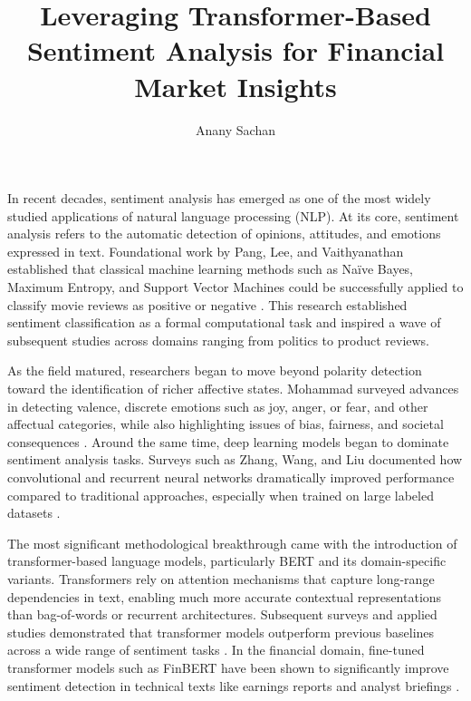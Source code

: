 \documentclass[12pt]{article}
\title{\textbf{Leveraging Transformer-Based Sentiment Analysis for Financial Market Insights}}
\author{Anany Sachan}
\begin{document}
\maketitle

In recent decades, sentiment analysis has emerged as one of the most widely studied applications of
natural language processing (NLP). At its core, sentiment analysis refers to the automatic detection of
opinions, attitudes, and emotions expressed in text. Foundational work by Pang, Lee, and Vaithyanathan
established that classical machine learning methods such as Naïve Bayes, Maximum Entropy, and Support
Vector Machines could be successfully applied to classify movie reviews as positive or negative
\cite{10.3115/1118693.1118704}. This research established sentiment classification as a formal
computational task and inspired a wave of subsequent studies across domains ranging from politics to
product reviews.

As the field matured, researchers began to move beyond polarity detection toward the identification of
richer affective states. Mohammad surveyed advances in detecting valence, discrete emotions such as joy,
anger, or fear, and other affectual categories, while also highlighting issues of bias, fairness, and
societal consequences \cite{SentimentEmotionSurvey2021}. Around the same time, deep learning models
began to dominate sentiment analysis tasks. Surveys such as Zhang, Wang, and Liu documented how
convolutional and recurrent neural networks dramatically improved performance compared to traditional
approaches, especially when trained on large labeled datasets \cite{10.1002/widm.1253}.

The most significant methodological breakthrough came with the introduction of transformer-based
language models, particularly BERT and its domain-specific variants. Transformers rely on attention
mechanisms that capture long-range dependencies in text, enabling much more accurate contextual
representations than bag-of-words or recurrent architectures. Subsequent surveys and applied studies
demonstrated that transformer models outperform previous baselines across a wide range of sentiment
tasks \cite{10.1145/3586075,10.1145/3650215.3650260}. In the financial domain, fine-tuned transformer
models such as FinBERT have been shown to significantly improve sentiment detection in technical texts
like earnings reports and analyst briefings \cite{10.1145/3543873.3587605,araci2019finbert}.
\end{document}
